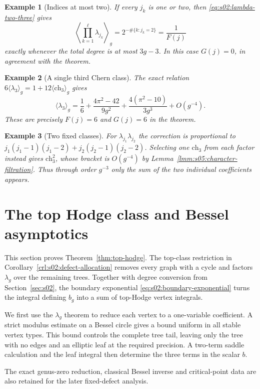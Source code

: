 \documentclass[a4paper,10pt]{article}
\numberwithin{equation}{section}
\theoremstyle{paperplain}
\theoremstyle{paperremark}
\newtheorem{exm}{Example}[section]
\theoremstyle{paperplain}
\begin{document}
\begin{exm}[Indices at most two]
If every $j_k$ is one or two, then
\eqref{eq:s02:lambda-two-three} gives
\[
 \left\langle\prod_{k=1}^{\ell}\lambda_{j_k}\right\rangle_g
 =2^{-\#\{k:j_k=2\}}=\frac1{F(j)}
\]
exactly whenever the total degree is at most $3g-3$.
In this case $G(j)=0$, in agreement with the theorem.
\end{exm}

\begin{exm}[A single third Chern class]
The exact relation
$6\langle\lambda_3\rangle_g=1+12\langle\mathrm{ch}_3\rangle_g$
gives
\[
 \langle\lambda_3\rangle_g
 =\frac16+\frac{4\pi^2-42}{9g^2}
          +\frac{4(\pi^2-10)}{3g^3}+O(g^{-4}).
\]
These are precisely $F(j)=6$ and $G(j)=6$ in the theorem.
\end{exm}

\begin{exm}[Two fixed classes]
For $\lambda_{j_1}\lambda_{j_2}$ the correction is proportional to
$j_1(j_1-1)(j_1-2)+j_2(j_2-1)(j_2-2)$.
Selecting one $\mathrm{ch}_3$ from each factor instead gives
$\mathrm{ch}_3^2$, whose bracket is $O(g^{-4})$ by
Lemma~\ref{lmm:s05:character-filtration}. Thus through order
$g^{-3}$ only the sum of the two individual coefficients appears.
\end{exm}


\section{The top Hodge class and Bessel asymptotics}
\label{sec:s06}

This section proves Theorem~\ref{thm:top-hodge}. The top-class
restriction in Corollary~\ref{crl:s02:defect-allocation} removes
every graph with a cycle and factors $\lambda_g$ over the remaining
trees. Together with degree conversion from
Section~\ref{sec:s02}, the boundary exponential
\eqref{eq:s02:boundary-exponential} turns the integral defining $b_g$
into a sum of top-Hodge vertex integrals.

We first use the $\lambda_g$ theorem to reduce each vertex to a
one-variable coefficient. A strict modulus estimate on a Bessel
circle gives a bound uniform in all stable vertex types. This bound
controls the complete tree tail, leaving only the tree with no
edges and an elliptic leaf at the required precision. A two-term
saddle calculation and the leaf integral then determine the three
terms in the scalar $b$.

The exact genus-zero reduction, classical Bessel inverse and
critical-point data are also retained for the later fixed-defect
analysis.
\end{document}
